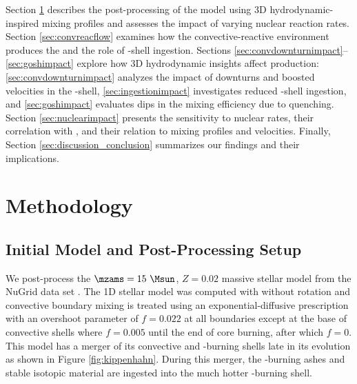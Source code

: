 Section \ref{sec:methods} describes the post-processing of the \cite{ritterNuGridStellarData2018} model using 3D hydrodynamic-inspired mixing profiles and assesses the impact of varying nuclear reaction rates.
Section \ref{sec:convreacflow} examines how the convective-reactive environment produces the \pnucn{} and the role of \carbon[]-shell ingestion.
Sections \ref{sec:convdownturnimpact}{--}\ref{sec:goshimpact} explore how 3D hydrodynamic insights affect \pnucn{} production: \ref{sec:convdownturnimpact} analyzes the impact of downturns and boosted velocities in the \oxygen[]-shell, \ref{sec:ingestionimpact} investigates reduced \carbon[]-shell ingestion, and \ref{sec:goshimpact} evaluates dips in the mixing efficiency due to quenching.
Section \ref{sec:nuclearimpact} presents the sensitivity to nuclear rates, their correlation with \pnucn{}, and their relation to mixing profiles and velocities.
Finally, Section \ref{sec:discussion_conclusion} summarizes our findings and their implications.
  
\section{Methodology} \label{sec:methods}

\subsection{Initial Model and Post-Processing Setup}

We post-process the $\mzams=15~\Msun$, $Z=0.02$ massive stellar model from the NuGrid data set \citep{ritterNuGridStellarData2018}.
The 1D stellar model was computed with \MESA{} \citep{paxtonMODULESEXPERIMENTSLAR2010} without rotation and convective boundary mixing is treated using an exponential-diffusive prescription \citep{freytagHydrodynamicalModelsStellar1996,herwigEvolutionAGBStars2000} with an overshoot parameter of $f=0.022$ at all boundaries except at the base of convective shells where $f=0.005$ until the end of core \helium[] burning, after which $f=0$.
This model has a merger of its convective \oxygen[] and \carbon[]-burning shells late in its evolution as shown in Figure \ref{fig:kippenhahn}.
During this merger, the \carbon[]-burning ashes and stable isotopic material are ingested into the much hotter \oxygen[]-burning shell.

